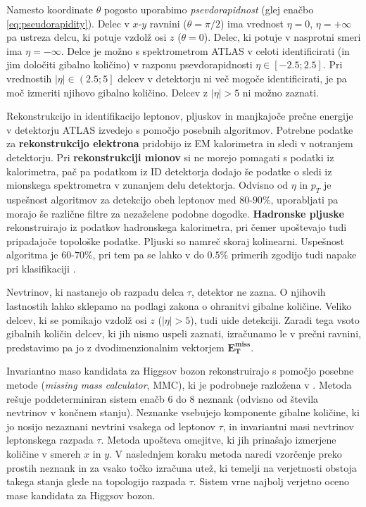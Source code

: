 \documentclass[11pt,a4paper,openany]{book}
\begin{document}
Namesto koordinate $\theta$ pogosto uporabimo \textit{psevdorapidnost} (glej enačbo \ref{eq:pseudorapidity}). Delec v $x\text{-}y$ ravnini ($\theta = \pi/2$) ima vrednost $\eta = 0$, $\eta = +\infty$ pa ustreza delcu, ki potuje vzdolž osi $z$ ($\theta = 0$). Delec, ki potuje v nasprotni smeri ima $\eta = -\infty$. Delce je možno s spektrometrom ATLAS v celoti identificirati (in jim določiti gibalno količino) v razponu psevdorapidnosti $\eta \in \left[-\num{2,5}; \num{2,5} \right]$. Pri vrednostih $|\eta| \in \left(\num{2,5}; 5\right]$ delcev v detektorju ni več mogoče identificirati, je pa moč izmeriti njihovo gibalno količino. Delcev z $|\eta| > 5$ ni možno zaznati.

Rekonstrukcijo in identifikacijo leptonov, pljuskov in manjkajoče prečne energije v detektorju ATLAS izvedejo s pomočjo posebnih algoritmov. Potrebne podatke za \textbf{rekonstrukcijo elektrona} pridobijo iz EM kalorimetra in sledi v notranjem detektorju. Pri \textbf{rekonstrukciji mionov} si ne morejo pomagati s podatki iz kalorimetra, pač pa podatkom iz ID detektorja dodajo še podatke o sledi iz mionskega spektrometra v zunanjem delu detektorja. Odvisno od $\eta$ in $p_T$ je uspešnost algoritmov za detekcijo obeh leptonov med $80\mbox{-}90\%$, uporabljati pa morajo še različne filtre za nezaželene podobne dogodke. \textbf{Hadronske pljuske} rekonstruirajo iz podatkov hadronskega kalorimetra, pri čemer upoštevajo tudi pripadajoče topološke podatke. Pljuski so namreč skoraj kolinearni. Uspešnost algoritma je $60\mbox{-}70\%$, pri tem pa se lahko v do $\num{0,5}\%$ primerih zgodijo tudi napake pri klasifikaciji \cite{atlas2013}.

Nevtrinov, ki nastanejo ob razpadu delca $\tau$, detektor ne zazna. O njihovih lastnostih lahko sklepamo na podlagi zakona o ohranitvi gibalne količine. Veliko delcev, ki se pomikajo vzdolž osi $z$ ($|\eta| > 5$), tudi uide detekciji. Zaradi tega vsoto gibalnih količin delcev, ki jih nismo uspeli zaznati, izračunamo le v prečni ravnini, predstavimo pa jo z dvodimenzionalnim vektorjem $\mathbf{E^{miss}_T}$.

Invariantno maso kandidata za Higgsov bozon rekonstruirajo s pomočjo posebne metode (\textit{missing mass calculator}, MMC), ki je podrobneje razložena v \cite{tautaumassrecon}. Metoda rešuje poddeterminiran sistem enačb 6 do 8 neznank (odvisno od števila nevtrinov v končnem stanju). Neznanke vsebujejo komponente gibalne količine, ki jo nosijo nezaznani nevtrini vsakega od leptonov $\tau$, in invariantni masi nevtrinov leptonskega razpada $\tau$. Metoda upošteva omejitve, ki jih prinašajo izmerjene količine v smereh $x$ in $y$. V naslednjem koraku metoda naredi vzorčenje preko prostih neznank in za vsako točko izračuna utež, ki temelji na verjetnosti obstoja takega stanja glede na topologijo razpada $\tau$. Sistem vrne najbolj verjetno oceno mase kandidata za Higgsov bozon.
\end{document}
